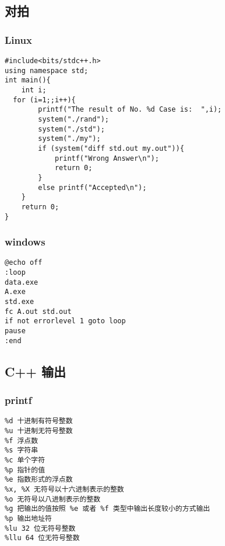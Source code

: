 \documentclass[UTF8]{ctexart}
\begin{document}
\subsection{对拍}
\subsubsection{Linux}

\begin{framed}
\begin{lstlisting}
#include<bits/stdc++.h>
using namespace std;
int main(){
    int i;
  for (i=1;;i++){
        printf("The result of No. %d Case is:  ",i);
        system("./rand");
        system("./std");
        system("./my");
        if (system("diff std.out my.out")){
            printf("Wrong Answer\n");
            return 0;
        }
        else printf("Accepted\n");
    }
    return 0;
}
\end{lstlisting}
\end{framed}

\subsubsection{windows}

\begin{framed}
\begin{lstlisting}
@echo off
:loop
data.exe
A.exe
std.exe
fc A.out std.out
if not errorlevel 1 goto loop
pause
:end
\end{lstlisting}
\end{framed}

\subsection{C++ 输出}

\subsubsection{printf}

\begin{framed}
\begin{lstlisting}
%d 十进制有符号整数
%u 十进制无符号整数
%f 浮点数
%s 字符串
%c 单个字符
%p 指针的值
%e 指数形式的浮点数
%x, %X 无符号以十六进制表示的整数
%o 无符号以八进制表示的整数
%g 把输出的值按照 %e 或者 %f 类型中输出长度较小的方式输出
%p 输出地址符
%lu 32 位无符号整数
%llu 64 位无符号整数
\end{lstlisting}
\end{framed}
\end{document}
